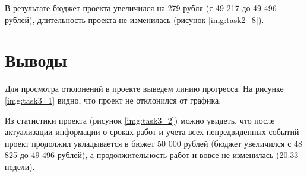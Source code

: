 \documentclass{bmstu}
\begin{document}
\clearpage

В результате бюджет проекта увеличился на 279 рубля (с 49 217 до 49 496 рублей), длительность проекта не изменилась (рисунок \ref{img:task2_8}).


\clearpage

\section*{Выводы}

Для просмотра отклонений в проекте выведем линию прогресса. На рисунке \ref{img:task3_1} видно, что проект не отклонился от графика.

Из статистики проекта (рисунок \ref{img:task3_2}) можно увидеть, что после актуализации информации о сроках работ и учета всех непредвиденных событий проект продолжил укладывается в бюжет 50 000 рублей (бюджет увеличился с 48 825 до 49 496 рублей), а продолжительность работ и вовсе не изменилась (20.33 недели).


\end{document}
